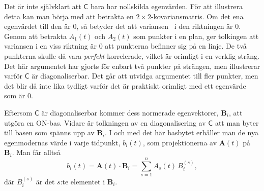 Det är inte självklart att $\mathsf{C}$ bara har nollskilda egenvärden. För att illustrera detta kan man börja med att betrakta en $2\times 2$-kovariansmatris. Om det ena egenvärdet till den är $0$, så betyder det att variansen~\cite{Shlens_PCA2014} i den riktningen är $0$. Genom att betrakta $A_1(t)$ och $A_2(t)$ som punkter i en plan, ger tolkingen att variansen i en viss riktning är $0$ att punkterna befinner sig på en linje\footnotemark{}. De två punkterna skulle då vara \emph{perfekt} korrelerade, vilket är orimligt i en verklig sträng. Det här argumentet har gjorts för enbart två punkter på strängen, men illustrerar varför $\mathsf{C}$ är diagonaliserbar. Det går att utvidga argumentet till fler punkter, men det blir då inte lika tydligt varför det är praktiskt orimligt med ett egenvärde som är $0$. 

Eftersom $\mathsf{C}$ är diagonaliserbar kommer dess normerade egenvektorer, $\mathbf{B}_i$, att utgöra en ON-bas. Vidare är tolkningen av en diagonalisering av $\mathsf{C}$ att man byter till basen som spänns upp av $\mathbf{B}_i$. I och med det här basbytet erhåller man de nya egenmodernas värde i varje tidpunkt, $b_i(t)$, som projektionerna av $\mathbf{A}(t)$ på $\mathbf{B}_i$. Man får alltså
\begin{equation} \label{eq:egenmod_b}
b_i(t) = \mathbf{A}(t)\cdot\mathbf{B}_i =\sum_{s=1}^n A_s(t)\,B_i^{(s)},
\end{equation}
där $B_i^{(s)}$ är det $s$:te elementet i $\mathbf{B}_i$.

\begin{comment} 
Kovariansmatrisen bildas sedan av $A_s(t)$ enligt \eqref{eq:kovmatris}. Detta ger
\begin{equation}
\label{eq:C}
    \mathsf{C}_{s s'} = \COV{A_s(t)}{A_{s'}(t)}_t.
\end{equation}
Egenvektorerna, även kallade egenmoderna, till $\mathsf{C}$ betecknas $\mathbf{B}_i$ och strängrörelsen kan representeras som
\begin{equation}
    A_s(t) = \sum_i^n \alpha_{si}(t)\mathbf{B_i}.
\end{equation}
Här ges
\begin{equation}
    \alpha_{si}(t) = A_s(t)\mathbf{B}_i\cdot\hat{\mathbf{A}}_s,
\end{equation}
där $\hat{\mathbf{A}}_s$ är enhetsvektorn för komponent $s$. 

Projektionen av strängrörelsen på varje egenmod som funktion av tiden beskrivs av
\begin{equation}
    b_i(t) = \sum_s^n \alpha_{si}(t).
\end{equation}
Alltså är $b_i(t)$ ett mått på hur mycket av strängen som vid tiden $t$ består av egenmod $\mathbf{B_i}$, vilket kan liknas med expansionskofficent vid utveckling av en funktion i fourierserie.
\end{comment} 

